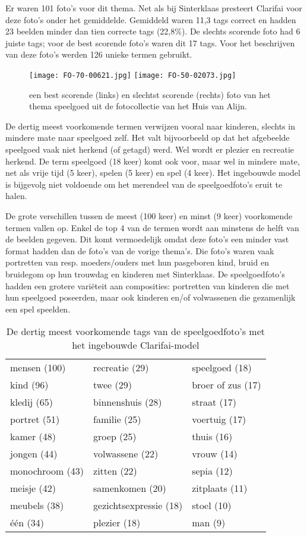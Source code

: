 Er waren 101 foto’s voor dit thema. Net als bij Sinterklaas presteert Clarifai voor deze foto’s onder het gemiddelde. Gemiddeld waren 11,3 tags correct en hadden 23 beelden minder dan tien correcte tags (22,8\%). De slechts scorende foto had 6 juiste tags; voor de best scorende foto’s waren dit 17 tags. Voor het beschrijven van deze foto’s werden 126 unieke termen gebruikt.

\begin{figure}
	\centering
	\texttt{[image: FO-70-00621.jpg]}\hfill
	\texttt{[image: FO-50-02073.jpg]}\hfill
	\caption[Best en slechtst scorende foto van thema speelgoed]{een best scorende (links) en slechtst scorende (rechts) foto van het thema speelgoed uit de fotocollectie van het Huis van Alijn.}
\end{figure}

De dertig meest voorkomende termen verwijzen vooral naar kinderen, slechts in mindere mate naar speelgoed zelf. Het valt bijvoorbeeld op dat het afgebeelde speelgoed vaak niet herkend (of getagd) werd. Wel wordt er plezier en recreatie herkend. De term speelgoed (18 keer) komt ook voor, maar wel in mindere mate, net als vrije tijd (5 keer), spelen (5 keer) en spel (4 keer). Het ingebouwde model is bijgevolg niet voldoende om het merendeel van de speelgoedfoto’s eruit te halen.

De grote verschillen tussen de meest (100 keer) en minst (9 keer) voorkomende termen vallen op. Enkel de top 4 van de termen wordt aan minstens de helft van de beelden gegeven. Dit komt vermoedelijk omdat deze foto’s een minder vast format hadden dan de foto’s van de vorige thema’s. Die foto’s waren vaak portretten van resp. moeders/ouders met hun pasgeboren kind, bruid en bruidegom op hun trouwdag en kinderen met Sinterklaas. De speelgoedfoto’s hadden een grotere variëteit aan composities: portretten van kinderen die met hun speelgoed poseerden, maar ook kinderen en/of volwassenen die gezamenlijk een spel speelden. 

\begin{table}
	\centering
	\begin{tabular}{*{3}{l}}
		mensen (100) & recreatie (29) & speelgoed (18) \\
		kind (96) & twee (29) & broer of zus (17) \\
		kledij (65) & binnenshuis (28) & straat (17) \\
		portret (51) & familie (25) & voertuig (17) \\
		kamer (48) & groep (25) & thuis (16) \\
		jongen (44) & volwassene (22) & vrouw (14) \\
		monochroom (43) & zitten (22) & sepia (12) \\
		meisje (42) & samenkomen (20) & zitplaats (11) \\
		meubels (38) & gezichtsexpressie (18) & stoel (10) \\
		één (34) & plezier (18) & man (9) \\
	\end{tabular}
	\caption{De dertig meest voorkomende tags van de speelgoedfoto's met het ingebouwde Clarifai-model}
	\label{tab:30-termen-speelgoed}
\end{table}

